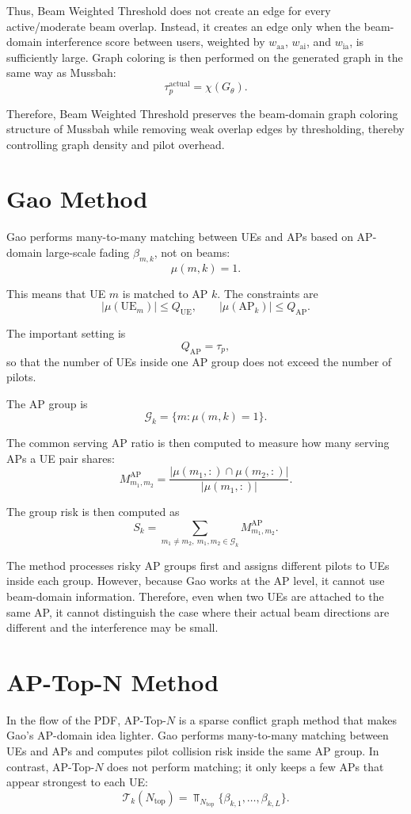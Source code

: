 \documentclass[11pt,a4paper]{article}
\newcommand{\tauactual}{\tau_{p}^{\mathrm{actual}}}
\newcommand{\waa}{w_{\mathrm{aa}}}
\newcommand{\wai}{w_{\mathrm{ai}}}
\newcommand{\wia}{w_{\mathrm{ia}}}
\begin{document}
Thus, Beam Weighted Threshold does not create an edge for every active/moderate beam overlap. Instead, it creates an edge only when the beam-domain interference score between users, weighted by \(\waa\), \(\wai\), and \(\wia\), is sufficiently large. Graph coloring is then performed on the generated graph in the same way as Mussbah:
\[
    \tauactual=\chi(G_{\theta}).
\]

Therefore, Beam Weighted Threshold preserves the beam-domain graph coloring structure of Mussbah while removing weak overlap edges by thresholding, thereby controlling graph density and pilot overhead.

\section{Gao Method}

Gao performs many-to-many matching between UEs and APs based on AP-domain large-scale fading \(\beta_{m,k}\), not on beams:
\[
    \mu(m,k)=1.
\]

This means that UE \(m\) is matched to AP \(k\). The constraints are
\[
    |\mu(\mathrm{UE}_m)|\le Q_{\mathrm{UE}},
    \qquad
    |\mu(\mathrm{AP}_k)|\le Q_{\mathrm{AP}}.
\]

The important setting is
\[
    Q_{\mathrm{AP}}=\tau_p,
\]
so that the number of UEs inside one AP group does not exceed the number of pilots.

The AP group is
\[
    \mathcal{G}_k=\{m:\mu(m,k)=1\}.
\]

The common serving AP ratio is then computed to measure how many serving APs a UE pair shares:
\[
    M_{m_1,m_2}^{\mathrm{AP}}
    =
    \frac{|\mu(m_1,:)\cap\mu(m_2,:)|}{|\mu(m_1,:)|}.
\]

The group risk is then computed as
\[
    S_k
    =
    \sum_{m_1\neq m_2,\ m_1,m_2\in\mathcal{G}_k}
    M_{m_1,m_2}^{\mathrm{AP}}.
\]

The method processes risky AP groups first and assigns different pilots to UEs inside each group. However, because Gao works at the AP level, it cannot use beam-domain information. Therefore, even when two UEs are attached to the same AP, it cannot distinguish the case where their actual beam directions are different and the interference may be small.

\section{AP-Top-N Method}

In the flow of the PDF, AP-Top-\(N\) is a sparse conflict graph method that makes Gao's AP-domain idea lighter. Gao performs many-to-many matching between UEs and APs and computes pilot collision risk inside the same AP group. In contrast, AP-Top-\(N\) does not perform matching; it only keeps a few APs that appear strongest to each UE:
\[
    \mathcal{T}_k(N_{\mathrm{top}})
    =
    \Top_{N_{\mathrm{top}}}\{\beta_{k,1},\ldots,\beta_{k,L}\}.
\]
\end{document}
